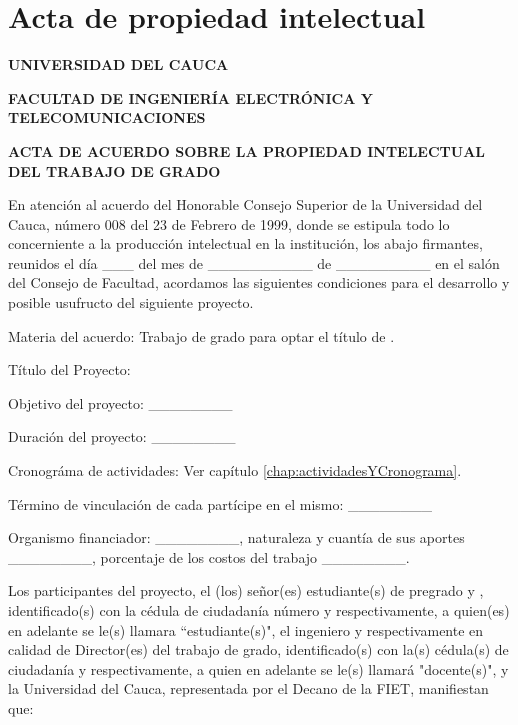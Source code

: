 \def\baselinestretch{1}
\chapter{Acta de propiedad intelectual}
\ifpdf
    \graphicspath{{actapropiedadintelectual/actapropiedadintelectualFigs/PNG/}{actapropiedadintelectual/actapropiedadintelectualFigs/PDF/}{actapropiedadintelectual/actapropiedadintelectualFigs/}}
\else
    \graphicspath{{actapropiedadintelectual/actapropiedadintelectualFigs/EPS/}{actapropiedadintelectual/actapropiedadintelectualFigs/}}
\fi

\def\baselinestretch{1.66}

\begin{center}
\textbf{UNIVERSIDAD DEL CAUCA}

\textbf{FACULTAD DE INGENIERÍA ELECTRÓNICA Y TELECOMUNICACIONES}

\textbf{ACTA DE ACUERDO SOBRE LA PROPIEDAD INTELECTUAL DEL TRABAJO DE GRADO}
\end{center}

En atención al acuerdo del Honorable Consejo Superior de la Universidad del Cauca, número 008 del 23 de Febrero de 1999, donde se estipula todo lo concerniente a la producción intelectual en la institución, los abajo firmantes, reunidos el día \_\_\_ del mes de \_\_\_\_\_\_\_\_\_\_ de \_\_\_\_\_\_\_\_\_ en el salón del Consejo de Facultad, acordamos las siguientes condiciones para el desarrollo y posible usufructo del siguiente proyecto.

Materia del acuerdo: Trabajo de grado para optar el título de \mydegree.

Título del Proyecto: \mytitle

Objetivo del proyecto: \_\_\_\_\_\_\_\_

Duración del proyecto: \_\_\_\_\_\_\_\_

Cronográma de actividades: Ver capítulo \ref{chap:actividadesYCronograma}.

Término de vinculación de cada partícipe en el mismo: \_\_\_\_\_\_\_\_

Organismo financiador: \_\_\_\_\_\_\_\_, naturaleza y cuantía de sus aportes \_\_\_\_\_\_\_\_, porcentaje de los costos del trabajo \_\_\_\_\_\_\_\_. 

Los participantes del proyecto, el (los) señor(es) estudiante(s) de pregrado \myauthor{} \ifdefined\mycoauthor y \mycoauthor{}\fi, identificado(s) con la cédula de ciudadanía número \myidauthorcard{} \ifdefined\mycoauthor y \myidcoauthorcard{} respectivamente\fi, a quien(es) en adelante se le(s) llamara ``estudiante(s)", el ingeniero \mythesistutor{} \ifdefined\mythesiscotutor y \mythesiscotutor{} respectivamente \fi en calidad de Director(es) del trabajo de grado, identificado(s) con la(s) cédula(s) de ciudadanía \myidthesistutorcard{} \ifdefined\mythesiscotutor y \myidthesiscotutorcard{} respectivamente\fi, a quien en adelante se le(s) llamará "docente(s)", y la Universidad del Cauca, representada por el Decano de la FIET, manifiestan que:

